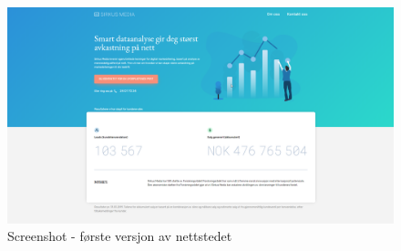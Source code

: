\begin{figure}[H]
    \centering
    \includegraphics[width=\textwidth]{versjon-1-nettsted.png}
    \caption{Screenshot - første versjon av nettstedet}
    \label{fig:first-version-website}
\end{figure}










